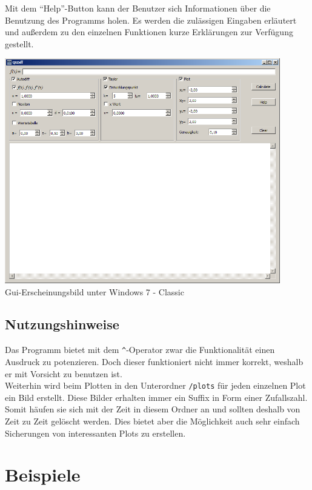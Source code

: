 \documentclass{scrartcl}
\begin{document}
Mit dem "`Help"'-Button kann der Benutzer sich Informationen über die Benutzung des Programms holen. Es werden die zulässigen Eingaben erläutert und außerdem zu den einzelnen Funktionen kurze Erklärungen zur Verfügung gestellt.\\ 
\begin{center}
\includegraphics[width=12cm]{./png/Gui1.png}
\\
\footnotesize{Gui-Erscheinungsbild unter Windows 7 - Classic}
\end{center}

\subsection{Nutzungshinweise}
Das Programm bietet mit dem \texttt{\^{ }}-Operator zwar die Funktionalität einen Ausdruck zu potenzieren. Doch dieser funktioniert nicht immer korrekt, weshalb er mit Vorsicht zu benutzen ist.\\
Weiterhin wird beim Plotten in den Unterordner \texttt{/plots} für jeden einzelnen Plot ein Bild erstellt. Diese Bilder erhalten immer ein Suffix in Form einer Zufallszahl. Somit häufen sie sich mit der Zeit in diesem Ordner an und sollten deshalb von Zeit zu Zeit gelöscht werden. Dies bietet aber die Möglichkeit auch sehr einfach Sicherungen von interessanten Plots zu erstellen.

\newpage
\section{Beispiele}
\end{document}

